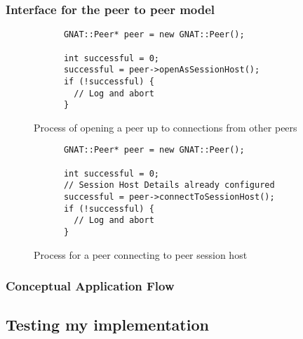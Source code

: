 \newpage
\subsubsection{Interface for the peer to peer model}

\begin{figure}[!h]
  \centering
  \begin{lstlisting}
      GNAT::Peer* peer = new GNAT::Peer();

      int successful = 0;
      successful = peer->openAsSessionHost();
      if (!successful) {
        // Log and abort
      }
  \end{lstlisting}
  \caption{Process of opening a peer up to connections from other peers}
  \label{code:peer_conn_host}
\end{figure}


\begin{figure}[!h]
  \centering
  \begin{lstlisting}
      GNAT::Peer* peer = new GNAT::Peer();

      int successful = 0;
      // Session Host Details already configured
      successful = peer->connectToSessionHost();
      if (!successful) {
        // Log and abort
      }
  \end{lstlisting}
  \caption{Process for a peer connecting to peer session host}
  \label{code:peer_conn_join}
\end{figure}

\newpage

\subsubsection{Conceptual Application Flow}


\subsection{Testing my implementation}
